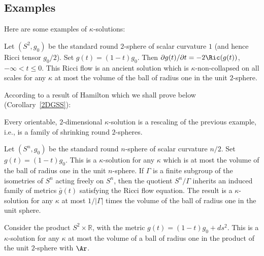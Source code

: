 \subsection{Examples}

Here are some examples of $\kappa$-solutions:
\begin{example}\label{ex:shrinking-sphere-kappa-solution}
Let $(S^{2},g_{0})$ be the standard round $2$-sphere of scalar
curvature $1$ (and hence Ricci tensor $g_0/2$). Set
$g(t)=(1-t)g_{0}$. Then $\partial g(t)/\partial t=-2\Ric(g(t))$, $-\infty<t\le 0$. This Ricci flow is an ancient
solution which is $\kappa$-non-collapsed on all scales for any
$\kappa$ at most the volume of the ball of radius one in the unit
$2$-sphere.
\end{example}

According to a result of Hamilton which we shall prove below
(Corollary~\ref{2DGSS}):

\begin{theorem}\label{thm:two-dimensional-kappa-solution-preview}
Every orientable, $2$-dimensional $\kappa$-solution is a rescaling
of the previous example, i.e., is a family of shrinking round
$2$-spheres.
\end{theorem}


\begin{example}\label{ex:round-sphere-quotient-kappa-solution}
Let $(S^n,g_0)$ be the standard round $n$-sphere of scalar curvature
$n/2$. Set $g(t)=(1-t)g_0$. This is a $\kappa$-solution for any
$\kappa$ which is at most the volume of the ball of radius one in
the unit $n$-sphere. If $\Gamma$ is a finite subgroup of the
isometries of $S^n$ acting freely on $S^n$, then the quotient
$S^n/\Gamma$ inherits an induced family of metrics $\bar g(t)$
satisfying the Ricci flow equation. The result is a
$\kappa$-solution for any $\kappa$ at most $1/|\Gamma|$ times the
volume of the ball of radius one in the unit sphere.
\end{example}

\smallskip

\begin{example}\label{ex:cylinder-kappa-solution}
Consider the product $S^{2}\times \mathbb{R} $, with the metric $
g(t) =(1-t)g_{0}+ds^{2}.$ This is a $\kappa$-solution for any
$\kappa$ at most the volume of a ball of radius one in the product
of the unit $2$-sphere with $\Ar$.
\end{example}


